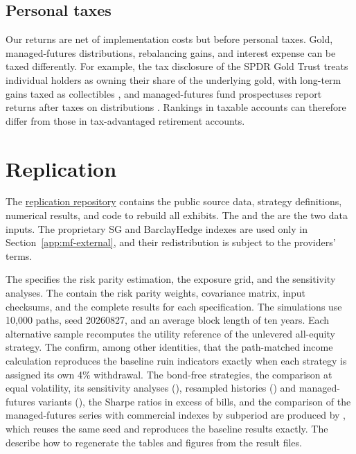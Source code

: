 


\subsection{Personal taxes}
\label{app:taxation}

Our returns are net of implementation costs but before personal taxes. Gold, managed-futures
distributions, rebalancing gains, and interest expense can be taxed differently. For example, the tax
disclosure of the SPDR Gold Trust treats individual holders as owning their share of the underlying gold,
with long-term gains taxed as collectibles \citep{GLDTax2022,IRSTopic409}, and managed-futures fund
prospectuses report returns after taxes on distributions \citep{DBMFTax2026}. Rankings in taxable accounts
can therefore differ from those in tax-advantaged retirement accounts.

\clearpage
\section{Replication}
\label{app:reproducibility}

The \href{\gitrepo}{replication repository} contains the public source data, strategy definitions,
numerical results, and code to rebuild all exhibits. The
 and the
 are the two data inputs. The
proprietary SG and BarclayHedge indexes are used only in Section~\ref{app:mf-external}, and their
redistribution is subject to the providers' terms.

The  specifies the risk parity
estimation, the exposure grid, and the sensitivity analyses. The
 contain the risk parity weights, covariance
matrix, input checksums, and the complete results for each specification. The simulations use 10,000
paths, seed 20260827, and an average block length of ten years. Each alternative sample recomputes the
utility reference of the unlevered all-equity strategy. The
 confirm, among other identities, that
the path-matched income calculation reproduces the baseline ruin indicators exactly when each strategy is
assigned its own 4\% withdrawal. The bond-free strategies, the comparison at equal volatility, its sensitivity analyses
(), resampled histories
() and
managed-futures variants (), the Sharpe ratios in excess of bills, and
the comparison of the managed-futures series with commercial indexes by subperiod are produced by
, which reuses the same seed and reproduces the
baseline results exactly. The  describe how
to regenerate the tables and figures from the result files.
